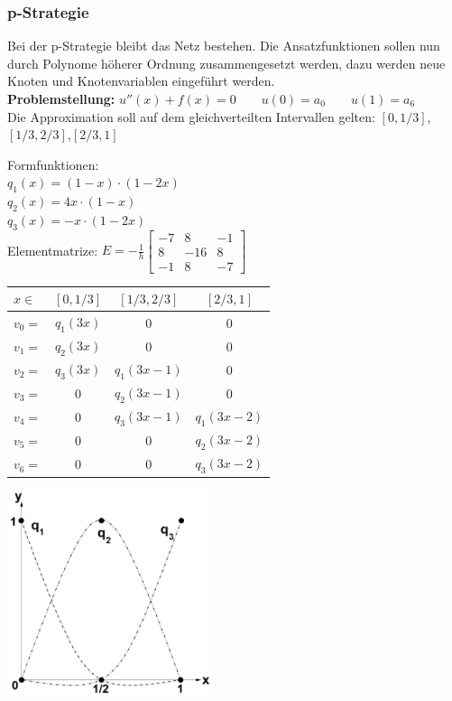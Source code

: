 \subsubsection{p-Strategie}
Bei der p-Strategie bleibt das Netz bestehen. Die Ansatzfunktionen sollen nun durch Polynome höherer Ordnung zusammengesetzt werden, dazu werden neue Knoten und Knotenvariablen eingeführt werden.\\

\textbf{Problemstellung:} $u''(x)+f(x)=0\qquad u(0)=a_0\qquad u(1)=a_6$\\

Die Approximation soll auf dem gleichverteilten Intervallen gelten: $[0,1/3]$,\quad $[1/3,2/3]$,\quad $[2/3,1]$\\

\begin{minipage}{4cm}
	Formfunktionen:\\

	$q_1(x)=(1-x)\cdot(1-2x)$\\
	$q_2(x)=4x\cdot(1-x)$\\
	$q_3(x)=-x\cdot(1-2x)$\\
	
	Elementmatrize: $\boxed{E=-\frac{1}{h}
	\begin{bmatrix}
		-7& 8 & -1\\
		8& -16& 8\\
		-1& 8& -7	
	\end{bmatrix}}$\\
\end{minipage}
\hfill
\begin{minipage}{8cm}
	\begin{tabular}{lc|c|c}
		$x\in$&$[0,1/3]$&$[1/3,2/3]$&$[2/3,1]$\\
		\hline
		$v_0=$&$q_1(3x)$&$0$&$0$\\
		$v_1=$&$q_2(3x)$&$0$&$0$\\
		$v_2=$&$q_3(3x)$&$q_1(3x-1)$&$0$\\
		$v_3=$&$0$&$q_2(3x-1)$&$0$\\
		$v_4=$&$0$&$q_3(3x-1)$&$q_1(3x-2)$\\
		$v_5=$&$0$&$0$&$q_2(3x-2)$\\
		$v_6=$&$0$&$0$&$q_3(3x-2)$\\
	\end{tabular}
\end{minipage}
\hfill
\begin{minipage}{6cm}
\includegraphics[width=6cm]{Content/Numerik/FEM2Ord}
\end{minipage}\\

